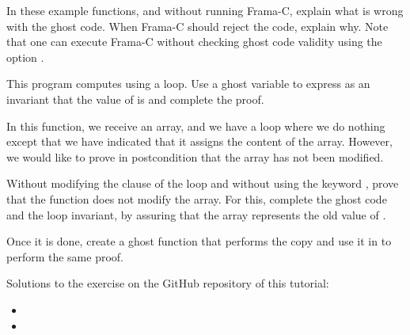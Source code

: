 



In these example functions, and without running Frama-C, explain what is
wrong with the ghost code. When Frama-C should reject the code, explain
why. Note that one can execute Frama-C without checking ghost code validity
using the option .








This program computes  using a loop. Use a ghost variable
 to express as an invariant that the value of 
is  and complete the proof.








In this function, we receive an array, and we have a loop where we do nothing
except that we have indicated that it assigns the content of the array. However,
we would like to prove in postcondition that the array has not been modified.





Without modifying the  clause of the loop and without using
the keyword , prove that the function does not
modify the array. For this, complete the ghost code and the loop invariant, by
assuring that the array  represents the old value of
.


Once it is done, create a ghost function that performs the copy and use it in
 to perform the same proof.

\begin{Information}
  Solutions to the exercise on the GitHub repository of this tutorial:
  \begin{itemize}
    \item {}
    \item {}
  \end{itemize}
\end{Information}


